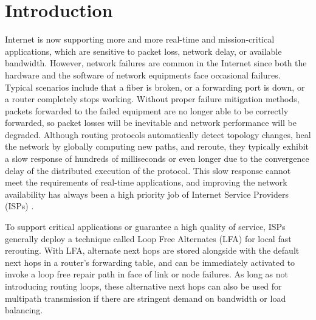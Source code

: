 \section{Introduction}
Internet is now supporting more and more real-time and mission-critical applications,
which are sensitive to packet loss, network delay, or available bandwidth.
However, network failures are common in the Internet \cite{Zheng}\cite{Xu2017Failure}
since both the hardware and the software of network equipments face occasional failures.
Typical scenarios include that a fiber is broken, or a forwarding port is down,
or a router completely stops working.
Without proper failure mitigation methods, packets forwarded to the failed equipment are
no longer able to be correctly forwarded, so packet losses will be inevitable
and network performance will be degraded.
Although routing protocols automatically detect topology changes,
heal the network by globally computing new paths, and reroute,
they typically exhibit a slow response of hundreds of milliseconds or even longer
due to the convergence delay of the distributed execution of the protocol.
This slow response cannot meet the requirements of real-time applications,
and improving the network availability has always been a high priority job of Internet Service
Providers (ISPs) \cite{Scalable,Jose2016Optimal,Yang2014Keep,Elhourani2016IP,Liu2013Ensuring,Stephens2016Scalable}.

To support critical applications or guarantee a high quality of service, ISPs generally deploy
a technique called Loop Free Alternates (LFA) \cite{IPFRR, LFA} for local fast rerouting.
With LFA, alternate next hops are stored alongside with the default next hops in a router's
forwarding table, and can be immediately activated to invoke a loop free repair path
in face of link or node failures. As long as not introducing routing loops,
these alternative next hops can also be used for multipath transmission
if there are stringent demand on bandwidth or load balancing.


